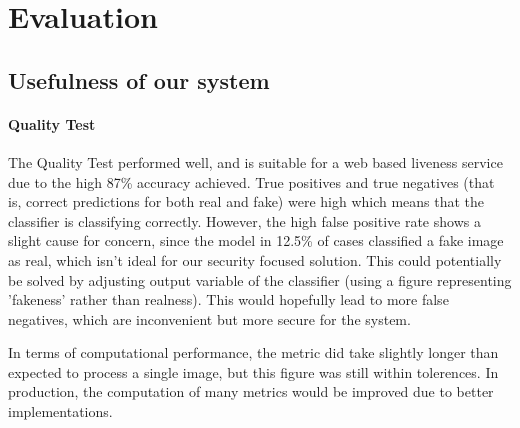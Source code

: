 \documentclass[11pt,a4paper]{article}
\begin{document}
\section{Evaluation}
    \subsection{Usefulness of our system}
    
        \paragraph{Quality Test}
            The Quality Test performed well, and is suitable for a web based liveness service due to the high 87\% accuracy achieved.
            True positives and true negatives (that is, correct predictions for both real and fake) were high which means that the classifier
            is classifying correctly. However, the high false positive rate shows a slight cause for concern, since the model in 12.5\% of cases
            classified a fake image as real, which isn't ideal for our security focused solution. This could potentially be solved by adjusting output
            variable of the classifier (using a figure representing 'fakeness' rather than realness). This would hopefully lead to more false negatives,
            which are inconvenient but more secure for the system.

            In terms of computational performance, the metric did take slightly longer than expected to process a single image, but this figure was still within
            tolerences. In production, the computation of many metrics would be improved due to better implementations.
\end{document}
